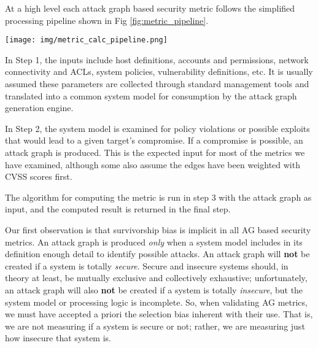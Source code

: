
At a high level each attack graph based security metric follows the simplified processing pipeline shown in Fig \ref{fig:metric_pipeline}. 


\begin{figure*}[ht]
\centering
\texttt{[image: img/metric\_calc\_pipeline.png]}
\caption{General Security Metric Evaluation Pipeline}
\label{fig:metric_pipeline}
\end{figure*} 

In Step 1, the inputs include host definitions, accounts and permissions, network connectivity and ACLs, system policies, vulnerability definitions, etc. It is usually assumed these parameters are collected through standard management tools and translated into a common system model for consumption by the attack graph generation engine. 

In Step 2, the system model is examined for policy violations or possible exploits that would lead to a given target's compromise. If a compromise is possible, an attack graph is produced. This is the expected input for most of the metrics we have examined, although some also assume the edges have been weighted with CVSS scores first.

The algorithm for computing the metric is run in step 3 with the attack graph as input, and the computed result is returned in the final step. 

Our first observation is that survivorship bias\cite{Wald_1980} is implicit in all AG based security metrics. An attack graph is produced \textit{only} when a system model includes in its definition enough detail to identify possible attacks. An attack graph will \textbf{not} be created if a system is totally \textit{secure}. Secure and insecure systems should, in theory at least, be mutually exclusive and collectively exhaustive; unfortunately, an attack graph will also \textbf{not} be created if a system is totally \textit{insecure}, but the system model or processing logic is incomplete. So, when validating AG metrics, we must have accepted a priori the selection bias inherent with their use. That is, we are not measuring if a system is secure or not; rather, we are measuring just how insecure that system is. 

